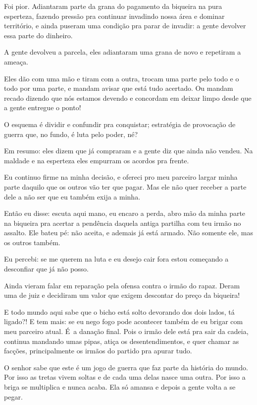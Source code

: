 Foi pior. Adiantaram parte da grana do pagamento da biqueira na pura
esperteza, fazendo pressão pra continuar invadindo nossa área e dominar
território, e ainda puseram uma condição pra parar de invadir: a gente
devolver essa parte do dinheiro.

A gente devolveu a parcela, eles adiantaram uma grana de novo e
repetiram a ameaça.

Eles dão com uma mão e tiram com a outra, trocam uma parte pelo todo e o
todo por uma parte, e mandam avisar que está tudo acertado. Ou mandam
recado dizendo que nós estamos devendo e concordam em deixar limpo desde
que a gente entregue o ponto!

O esquema é dividir e confundir pra conquistar; estratégia de provocação
de guerra que, no fundo, é luta pelo poder, né?

Em resumo: eles dizem que já compraram e a gente diz que ainda não
vendeu. Na maldade e na esperteza eles empurram os acordos pra frente.

Eu continuo firme na minha decisão, e ofereci pro meu parceiro largar
minha parte daquilo que os outros vão ter que pagar. Mas ele não quer
receber a parte dele a não ser que eu também exija a minha.

Então eu disse: escuta aqui mano, eu encaro a perda, abro mão da minha
parte na biqueira pra acertar a pendência daquela antiga partilha com
teu irmão no assalto. Ele bateu pé: não aceita, e ademais já está
armado. Não somente ele, mas os outros também.

Eu percebi: se me querem na luta e eu desejo cair fora estou começando a
desconfiar que já não posso.

Ainda vieram falar em reparação pela ofensa contra o irmão do rapaz.
Deram uma de juiz e decidiram um valor que exigem descontar do preço da
biqueira!

E todo mundo aqui sabe que o bicho está solto devorando dos dois lados,
tá ligado?! E tem mais: se eu nego fogo pode acontecer também de eu
brigar com meu parceiro atual. É~a danação final. Pois o irmão dele está
pra sair da cadeia, continua mandando umas pipas, atiça os
desentendimentos, e quer chamar as facções, principalmente os irmãos do
partido pra apurar tudo.

O senhor sabe que este é um jogo de guerra que faz parte da história do
mundo. Por isso as tretas vivem soltas e de cada uma delas nasce uma
outra. Por isso a briga se multiplica e nunca acaba. Ela só amansa e
depois a gente volta a se pegar.

